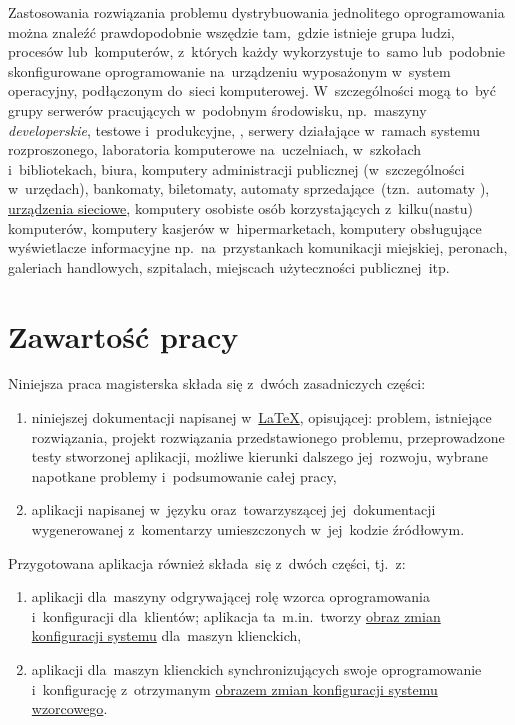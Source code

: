 \documentclass[thesis]{subfiles}
\begin{document}
Zastosowania rozwiązania problemu dystrybuowania jednolitego oprogramowania można znaleźć prawdopodobnie wszędzie tam,~gdzie istnieje grupa ludzi, procesów lub~komputerów, z~których każdy wykorzystuje to~samo lub~podobnie skonfigurowane oprogramowanie na~urządzeniu wyposażonym w~system operacyjny, podłączonym do~sieci komputerowej. W~szczególności mogą to~być grupy serwerów pracujących w~podobnym środowisku, np.~maszyny \emph{developerskie}, testowe i~produkcyjne, , serwery działające w~ramach systemu rozproszonego, laboratoria komputerowe na~uczelniach, w~szkołach i~bibliotekach, biura, komputery administracji publicznej (w~szczególności w~urzędach), bankomaty, biletomaty, automaty sprzedające~(tzn.~automaty ), \href{https://en.wikipedia.org/wiki/Networking_hardware}{urządzenia sieciowe}, komputery osobiste osób korzystających z~kilku(nastu) komputerów, komputery kasjerów w~hipermarketach, komputery obsługujące wyświetlacze informacyjne np.~na~przystankach komunikacji miejskiej, peronach, galeriach handlowych, szpitalach, miejscach użyteczności publicznej~itp.


\section{Zawartość pracy}

\noindent Niniejsza praca magisterska składa się z~dwóch zasadniczych części:\mynobreakpar
\begin{enumerate}
	\item niniejszej dokumentacji napisanej w~\href{https://en.wikipedia.org/wiki/LaTeX}{\LaTeX}, opisującej: problem, istniejące rozwiązania, projekt rozwiązania przedstawionego problemu, przeprowadzone testy stworzonej aplikacji, możliwe kierunki dalszego jej~rozwoju, wybrane napotkane problemy i~podsumowanie całej pracy,
	\item aplikacji napisanej w~języku \python{} oraz~towarzyszącej jej~dokumentacji wygenerowanej z~komentarzy umieszczonych w~jej~kodzie źródłowym.
\end{enumerate}
Przygotowana aplikacja również składa~się z~dwóch części, tj.~z:\mynobreakpar%
\begin{enumerate}
	\item aplikacji dla~maszyny odgrywającej rolę wzorca oprogramowania i~konfiguracji dla~klientów; aplikacja ta~m.in.~tworzy \hyperref[sec:obraz-zmian-konfiguracji]{obraz zmian konfiguracji systemu} dla~maszyn klienckich,
	\item aplikacji dla~maszyn klienckich synchronizujących swoje oprogramowanie i~konfigurację z~otrzymanym \hyperref[sec:obraz-zmian-konfiguracji]{obrazem zmian konfiguracji systemu wzorcowego}.
\end{enumerate}
\end{document}
